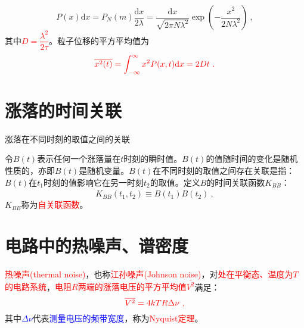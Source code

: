\documentclass[11pt,a4paper]{article}
\newcommand{\dif}{\mathrm{d}}
\begin{document}
\begin{equation}
P(x) \dif x= P_N(m) \dfrac{\dif x}{2\lambda} = \dfrac{\dif x}{\sqrt{2\pi N \lambda^2}} \exp \left(-\dfrac{x^2}{2N\lambda^2} \right) ~,
\end{equation}
其中\textcolor{red}{$D = \dfrac{\lambda^2}{2\tau}$}。粒子位移的平方平均值为
\begin{equation}
\color{red} \overline{x^2(t)} = \int_{-\infty}^\infty x^2 P(x,t) \dif x = 2 Dt ~.
\end{equation}



























\section{涨落的时间关联}
\cite{2007热力学与统计物理学} 涨落在不同时刻的取值之间的关联

令$B(t)$表示任何一个涨落量在$t$时刻的瞬时值。$B(t)$的值随时间的变化是随机性质的，亦即$B(t)$是随机变量。$B(t)$在不同时刻的取值之间存在关联是指：$B(t)$在$t_1$时刻的值影响它在另一时刻$t_2$的取值。定义$B$的时间关联函数$K_{BB}$：
\begin{equation}
K_{BB}(t_1, t_2) \equiv \overline{B(t_1)B(t_2)} ~,
\end{equation}
$K_{BB}$称为\textcolor{red}{自关联函数}。



\section{电路中的热噪声、谱密度}
\cite{2007热力学与统计物理学} \textcolor{red}{热噪声(thermal noise)}，也称\textcolor{red}{江孙噪声(Johnson noise)}，对\textcolor{red}{处在平衡态、温度为$T$的电路系统}，\textcolor{red}{电阻$R$两端的涨落电压的平方平均值$\overline{V^2}$}满足：
\begin{equation}
\color{red} \overline{V^2} = 4 k T R \Delta \nu ~,
\end{equation}
其中\textcolor{blue}{$\Delta \nu$}代表\textcolor{blue}{测量电压的频带宽度}，称为\textcolor{red}{Nyquist定理}。
\end{document}
